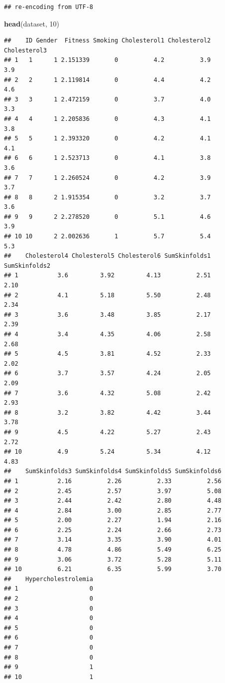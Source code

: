 \documentclass[]{book}
\newenvironment{Shaded}{\begin{snugshade}}{\end{snugshade}}
\newcommand{\KeywordTok}[1]{\textcolor[rgb]{0.13,0.29,0.53}{\textbf{#1}}}
\newcommand{\DecValTok}[1]{\textcolor[rgb]{0.00,0.00,0.81}{#1}}
\newcommand{\NormalTok}[1]{#1}
\theoremstyle{definition}
\theoremstyle{definition}
\theoremstyle{definition}
\theoremstyle{remark}
\begin{document}
\begin{verbatim}
## re-encoding from UTF-8
\end{verbatim}

\begin{Shaded}
\begin{Highlighting}[]
\KeywordTok{head}\NormalTok{(dataset, }\DecValTok{10}\NormalTok{)}
\end{Highlighting}
\end{Shaded}

\begin{verbatim}
##    ID Gender  Fitness Smoking Cholesterol1 Cholesterol2 Cholesterol3
## 1   1      1 2.151339       0          4.2          3.9          3.9
## 2   2      1 2.119814       0          4.4          4.2          4.6
## 3   3      1 2.472159       0          3.7          4.0          3.3
## 4   4      1 2.205836       0          4.3          4.1          3.8
## 5   5      1 2.393320       0          4.2          4.1          4.1
## 6   6      1 2.523713       0          4.1          3.8          3.6
## 7   7      1 2.260524       0          4.2          3.9          3.7
## 8   8      2 1.915354       0          3.2          3.7          3.6
## 9   9      2 2.278520       0          5.1          4.6          3.9
## 10 10      2 2.002636       1          5.7          5.4          5.3
##    Cholesterol4 Cholesterol5 Cholesterol6 SumSkinfolds1 SumSkinfolds2
## 1           3.6         3.92         4.13          2.51          2.10
## 2           4.1         5.18         5.50          2.48          2.34
## 3           3.6         3.48         3.85          2.17          2.39
## 4           3.4         4.35         4.06          2.58          2.68
## 5           4.5         3.81         4.52          2.33          2.02
## 6           3.7         3.57         4.24          2.05          2.09
## 7           3.6         4.32         5.08          2.42          2.93
## 8           3.2         3.82         4.42          3.44          3.78
## 9           4.5         4.22         5.27          2.43          2.72
## 10          4.9         5.24         5.34          4.12          4.83
##    SumSkinfolds3 SumSkinfolds4 SumSkinfolds5 SumSkinfolds6
## 1           2.16          2.26          2.33          2.56
## 2           2.45          2.57          3.97          5.08
## 3           2.44          2.42          2.80          4.48
## 4           2.84          3.00          2.85          2.77
## 5           2.00          2.27          1.94          2.16
## 6           2.25          2.24          2.66          2.73
## 7           3.14          3.35          3.90          4.01
## 8           4.78          4.86          5.49          6.25
## 9           3.06          3.72          5.28          5.11
## 10          6.21          6.35          5.99          3.70
##    Hypercholestrolemia
## 1                    0
## 2                    0
## 3                    0
## 4                    0
## 5                    0
## 6                    0
## 7                    0
## 8                    0
## 9                    1
## 10                   1
\end{verbatim}
\end{document}

